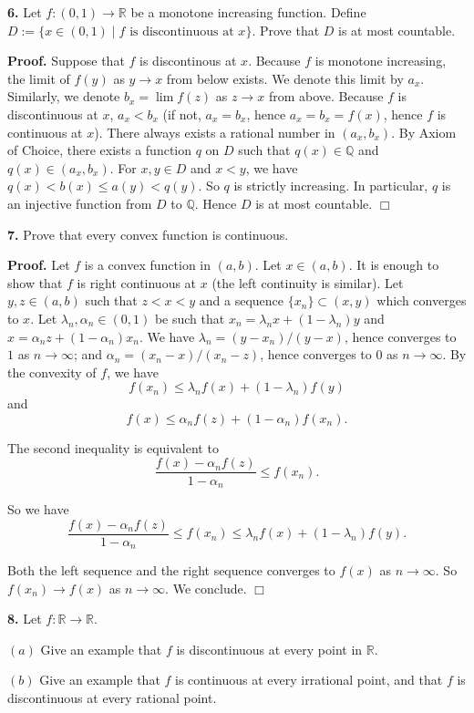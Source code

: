 \documentclass{article}
\begin{document}
    \textbf{6.} Let $f:(0,1)\to \mathbb{R}$ be a monotone increasing
function. Define $D:=\{x\in (0,1)\mid f\text{ is discontinuous at }x\}$.
Prove that $D$ is at most countable.

\textbf{Proof.} Suppose that $f$ is discontinous at $x$. Because $f$ is
monotone increasing, the limit of $f(y)$ as $y \to x$ from below exists.
We denote this limit by $a_x$. Similarly, we denote $b_x = \lim f(z)$ as
$z\to x$ from above. Because $f$ is discontinuous at $x$, $a_x < b_x$
(if not, $a_x = b_x$, hence $a_x=b_x=f(x)$, hence $f$ is continuous at
$x$). There always exists a rational number in $(a_x,b_x)$. By Axiom of
Choice, there exists a function $q$ on $D$ such that
$q(x)\in \mathbb{Q}$ and $q(x) \in (a_x,b_x)$. For $x,y\in D$ and
$x < y$, we have $q(x) < b(x) \le a(y) < q(y)$. So $q$ is strictly
increasing. In particular, $q$ is an injective function from $D$ to
$\mathbb{Q}$. Hence $D$ is at most countable. $\Box$

    \textbf{7.} Prove that every convex function is continuous.

\textbf{Proof.} Let $f$ is a convex function in $(a,b)$. Let
$x\in (a,b)$. It is enough to show that $f$ is right continuous at $x$
(the left continuity is similar). Let $y, z \in (a,b)$ such that
$z < x < y$ and a sequence $\{x_n\}\subset (x,y)$ which converges to
$x$. Let $\lambda_n,\alpha_n\in (0,1)$ be such that
$x_n = \lambda_n x + (1-\lambda_n)y$ and
$x = \alpha_n z + (1-\alpha_n)x_n$. We have $\lambda_n = (y-x_n)/(y-x)$,
hence converges to $1$ as $n\to \infty$; and
$\alpha_n = (x_n-x)/(x_n-z)$, hence converges to $0$ as $n\to \infty$.
By the convexity of $f$, we have \[
f(x_n) \le \lambda_n f(x) + (1-\lambda_n)f(y)
\] and \[
f(x) \le \alpha_n f(z) + (1-\alpha_n) f(x_n).
\]

The second inequality is equivalent to \[
\frac{f(x) - \alpha_n f(z)}{1-\alpha_n} \le f(x_n).
\]

So we have \[
\frac{f(x) - \alpha_n f(z)}{1-\alpha_n} \le f(x_n) \le \lambda_n f(x) + (1-\lambda_n)f(y).
\]

Both the left sequence and the right sequence converges to $f(x)$ as
$n \to\infty$. So $f(x_n) \to f(x)$ as $n\to \infty$. We conclude.
$\Box$

    \textbf{8.} Let $f:\mathbb{R}\to \mathbb{R}$.

$(a)$ Give an example that $f$ is discontinuous at every point in
$\mathbb{R}$.

$(b)$ Give an example that $f$ is continuous at every irrational point,
and that $f$ is discontinuous at every rational point.
\end{document}
